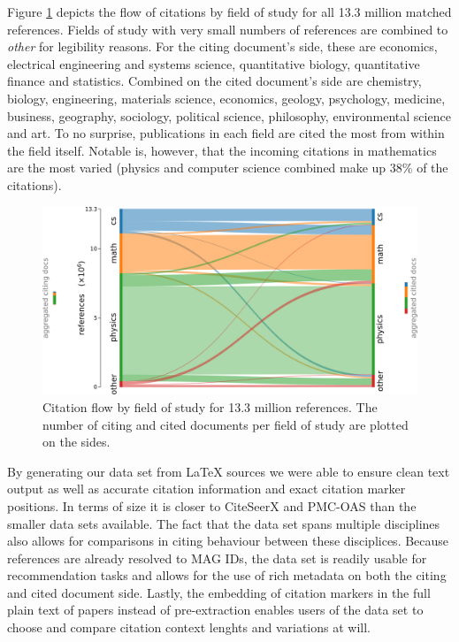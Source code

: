Figure \ref{fig:sankey} depicts the flow of citations by field of study for all 13.3 million matched references. Fields of study with very small numbers of references are combined to \emph{other} for legibility reasons. For the citing document's side, these are economics, electrical engineering and systems science, quantitative biology, quantitative finance and statistics. Combined on the cited document's side are chemistry, biology, engineering, materials science, economics, geology, psychology, medicine, business, geography, sociology, political science, philosophy, environmental science and art. To no surprise, publications in each field are cited the most from within the field itself. Notable is, however, that the incoming citations in mathematics are the most varied (physics and computer science combined make up 38\% of the citations).

\begin{figure}
  \centering
    \includegraphics[width=\textwidth]{figures/dataset/citation_relation_sankey.pdf}
  \caption[Citation flow by field of study for 13.3 million references.]{Citation flow by field of study for 13.3 million references. The number of citing and cited documents per field of study are plotted on the sides.}
  \label{fig:sankey}
\end{figure}

By generating our data set from \LaTeX{} sources we were able to ensure clean text output as well as accurate citation information and exact citation marker positions. In terms of size it is closer to CiteSeerX and PMC-OAS than the smaller data sets available. The fact that the data set spans multiple disciplines also allows for comparisons in citing behaviour between these disciplices. Because references are already resolved to MAG IDs, the data set is readily usable for recommendation tasks and allows for the use of rich metadata on both the citing and cited document side. Lastly, the embedding of citation markers in the full plain text of papers instead of pre-extraction enables users of the data set to choose and compare citation context lenghts and variations at will.
